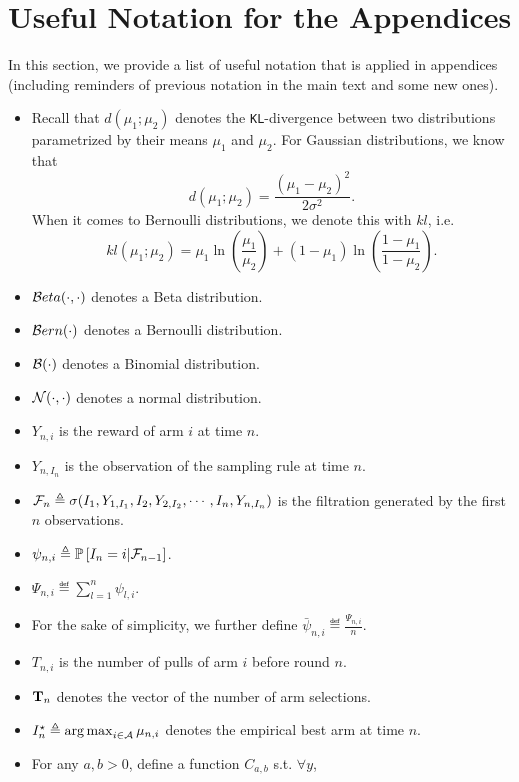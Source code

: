 \section{Useful Notation for the Appendices}\label{app:notation}

In this section, we provide a list of useful notation that is applied in appendices (including reminders of previous notation in the main text and some new ones).

\begin{itemize}
    \item Recall that $d(\mu_1;\mu_2)$ denotes the \texttt{KL}-divergence between two distributions parametrized by their means $\mu_1$ and $\mu_2$. For Gaussian distributions, we know that
    \[
        d(\mu_1;\mu_2) = \frac{(\mu_1-\mu_2)^2}{2\sigma^2}.
    \]
    When it comes to Bernoulli distributions, we denote this with $kl$, i.e.\
    \[
        kl(\mu_1;\mu_2) = \mu_1 \ln \left( \frac{\mu_1}{\mu_2} \right) + (1-\mu_1) \ln  \left( \frac{1-\mu_1}{1-\mu_2} \right).
    \]
    \item $\mathcal{B} eta(\cdot,\cdot)$ denotes a Beta distribution.
    \item $\mathcal{B} ern(\cdot)$ denotes a Bernoulli distribution.
    \item $\mathcal{B}(\cdot)$ denotes a Binomial distribution.
    \item $\mathcal{N}(\cdot,\cdot)$ denotes a normal distribution.
    \item $Y_{n,i}$ is the reward of arm $i$ at time $n$.
    \item $Y_{n,I_n}$ is the observation of the sampling rule at time $n$.
    \item $\mathcal{F}_n \triangleq \sigma(I_1,Y_{1,I_1}, I_2, Y_{2,I_2}, \cdots, I_n, Y_{n,I_n})$ is the filtration generated by the first $n$ observations.
    \item $\psi_{n,i} \triangleq \mathbb{P}\left[I_n = i | \mathcal{F}_{n-1}\right]$.
    \item $\Psi_{n,i} \eqdef \sum_{l=1}^n \psi_{l,i}$.
    \item For the sake of simplicity, we further define $\bar{\psi}_{n,i} \eqdef \frac{\Psi_{n,i}}{n}$.
    \item $T_{n,i}$ is the number of pulls of arm $i$ before round $n$.
    \item ${\bf T}_n$ denotes the vector of the number of arm selections. 
    \item $I_n^\star \triangleq \operatorname*{arg\,max}_{i\in\mathcal{A}} \mu_{n,i}$ denotes the empirical best arm at time $n$.
    \item For any $a, b > 0$, define a function $C_{a,b}$ s.t. $\forall y$,

\end{itemize}
